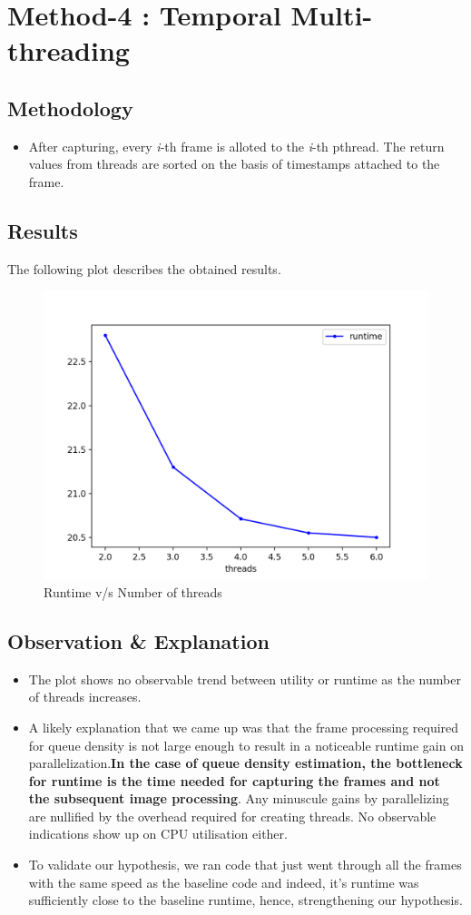\documentclass[a4paper]{article}
\begin{document}
\section*{Method-4 : Temporal Multi-threading}
\subsection*{Methodology}
\begin{itemize}
    \item After capturing, every \textit{i}-th frame is alloted to the \textit{i}-th pthread.  The return values from threads are sorted on the basis of timestamps attached to the frame.
\end{itemize}
\subsection*{Results}
The following plot describes the obtained results.
\begin{figure}[H]
    \centering
    \includegraphics[width=0.5\linewidth]{temporal-threads-runtime.png}
    \caption{Runtime v/s Number of threads}
    \label{fig:spatial-threads-runtime.png}
\end{figure}
\subsection*{Observation \& Explanation}
\begin{itemize}
    \item The plot shows no observable trend between utility or runtime as the number of threads increases. \item A likely explanation that we came up was that the frame processing required for queue density is not large enough to result in a noticeable runtime gain on parallelization.\textbf{In the case of queue density estimation, the bottleneck for runtime is the time needed for capturing the frames and not the subsequent image processing}. Any minuscule gains by parallelizing are nullified by the overhead required for creating threads. No observable indications show up on CPU utilisation either.
    \item To validate our hypothesis, we ran code that just went through all the frames with the same speed as the baseline code and indeed, it's runtime was sufficiently close to the baseline runtime, hence, strengthening our hypothesis.
\end{itemize}
\end{document}

